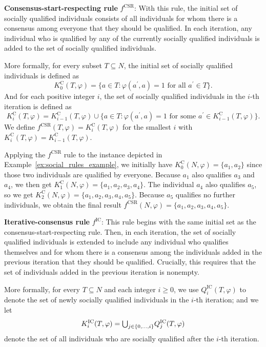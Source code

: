 \documentclass[
    12pt,               %
    a4paper,            %
    bibtotoc,           %
    pointlessnumbers,   %
    ngerman,            %
    titlepage,          %
    leqno,              %
    ]{scrarticle}       %
\newcommand\exref{Example~\ref}
\begin{document}
\textbf{Consensus-start-respecting rule} $f^{\text{CSR}}$: With this rule, the initial set of socially qualified individuals consists of all individuals for whom there is a consensus among everyone that they should be qualified. In each iteration, any individual who is qualified by any of the currently socially qualified individuals is added to the set of socially qualified individuals.

More formally, for every subset $T \subseteq N$, the initial set of socially qualified individuals is defined as
$$
K^{\text{C}}_0(T, \varphi) = \{ a \in T : \varphi(a^\prime, a) = 1 \text{ for all } a^\prime \in T \}.
$$
And for each positive integer $i$, the set of socially qualified individuals in the $i$-th iteration is defined as
$$
K^{\text{C}}_i(T, \varphi) = K^{\text{C}}_{i-1}(T, \varphi) \cup \{ a \in T : \varphi(a^\prime, a) = 1 \text{ for some } a^\prime \in K^{\text{C}}_{i-1}(T, \varphi) \}.
$$
We define $f^{\text{CSR}}(T, \varphi) = K^{\text{C}}_i(T, \varphi)$ for the smallest $i$ with $K^{\text{C}}_i(T, \varphi) = K^{\text{C}}_{i-1}(T, \varphi)$.

Applying the $f^{\text{CSR}}$ rule to the instance depicted in \exref{ex:social_rules_example}, we initially have $K^{\text{C}}_0(N, \varphi) = \{ a_1, a_2 \}$ since those two individuals are qualified by everyone. Because $a_1$ also qualifies $a_3$ and $a_4$, we then get $K^{\text{C}}_1(N, \varphi) = \{ a_1, a_2, a_3, a_4 \}$. The individual $a_4$ also qualifies $a_5$, so we get $K^{\text{C}}_2(N, \varphi) = \{ a_1, a_2, a_3, a_4, a_5 \}$. Because $a_5$ qualifies no further individuals, we obtain the final result $f^{\text{CSR}}(N, \varphi) = \{ a_1, a_2, a_3, a_4, a_5 \}$.



\textbf{Iterative-consensus rule} $f^{\text{IC}}$: This rule begins with the same initial set as the consensus-start-respecting rule. Then, in each iteration, the set of socially qualified individuals is extended to include any individual who qualifies themselves and for whom there is a consensus among the individuals added in the previous iteration that they should be qualified. Crucially, this requires that the set of individuals added in the previous iteration is nonempty.

More formally, for every $T \subseteq N$ and each integer $i \geq 0$, we use $Q^{\text{IC}}_i(T, \varphi)$ to denote the set of newly socially qualified individuals in the $i$-th iteration; and we let
$$
K^{\text{IC}}_i(T, \varphi) = \mathsmaller{\bigcup}_{j \in \{ 0, \ldots, i \}} Q^{\text{IC}}_j(T, \varphi)
$$
denote the set of all individuals who are socially qualified after the $i$-th iteration.
\end{document}
